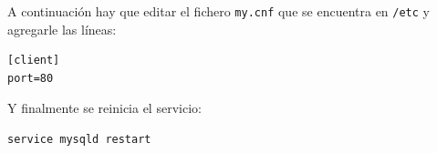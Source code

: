 A continuación hay que editar el fichero \texttt{my.cnf} que se encuentra en \texttt{/etc} y agregarle las líneas: 

\begin{lstlisting}
[client]
port=80
\end{lstlisting}

Y finalmente se reinicia el servicio: 

\begin{lstlisting}
service mysqld restart
\end{lstlisting}


\newpage


